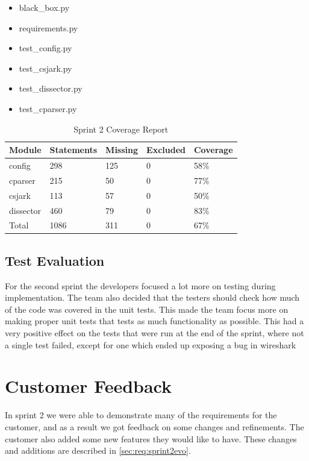 \begin{itemize}
\item black\_box.py
\item requirements.py
\item test\_config.py
\item test\_csjark.py
\item test\_\gls{dissector}.py
\item test\_cparser.py
\end{itemize}

\begin{table}[!htb] \footnotesize \center
	\caption{Sprint 2 Coverage Report\label{tab:sp2CoverageReport}}
	\begin{tabular}{l l l l l}
		\toprule
		Module & Statements & Missing & Excluded & Coverage\\
		\midrule
		config & 298 & 125 & 0 & 58\%\ \\
		cparser & 215 & 50 & 0 & 77\%\ \\
		csjark & 113 & 57 & 0 & 50\%\ \\
		\gls{dissector} & 460 & 79 & 0 & 83\%\ \\
		Total & 1086 & 311 & 0 & 67\%\ \\
		\bottomrule
	\end{tabular}
\end{table}


\subsection{Test Evaluation}
For the second sprint the developers focused a lot more on testing during implementation. The team also decided that the testers should check how much of the code was covered in the unit tests. This made the team focus more on making proper unit tests that tests as much functionality as possible. This had a very positive effect on the tests that were run at the end of the sprint, where not a single test failed, except for one which ended up exposing a bug in \Gls{wireshark}


\section{Customer Feedback}
\label{sec:sp2:feedback}
In sprint 2 we were able to demonstrate many of the requirements for the
customer, and as a result we got feedback on some changes and refinements.
The customer also added some new features they would like to have.
These changes and additions are described in \autoref{sec:req:sprint2evo}.

